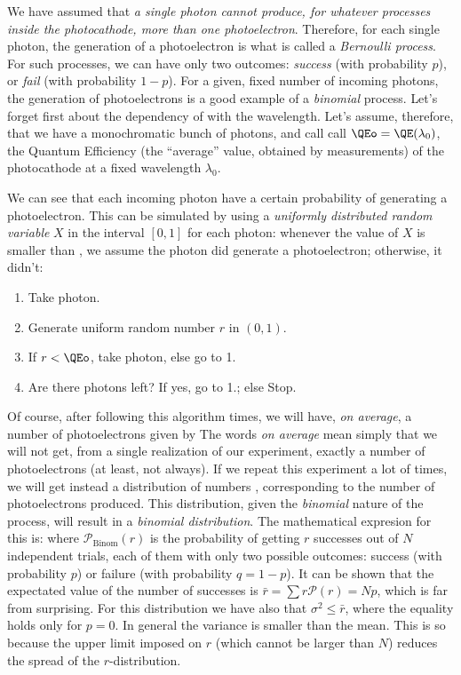 We have assumed that \emph{a single photon cannot produce, for
  whatever processes inside the photocathode, more than one
  photoelectron}. Therefore, for each single photon, the generation of
a photoelectron is what is called a \emph{Bernoulli process}. For such
processes, we can have only two outcomes: \emph{success} (with
probability $p$), or \emph{fail} (with probability $1-p$). For a
given, fixed number of incoming photons, the generation of
photoelectrons is a good example of a \emph{binomial} process. Let's
forget first about the dependency of \QE with the wavelength.  Let's
assume, therefore, that we have a monochromatic bunch of photons, and
call call $\QEo=\QE(\lambda_0)$, the Quantum Efficiency (the
``average'' value, obtained by measurements) of the photocathode at a
fixed wavelength $\lambda_0$.

\noutphotfig

We can see that each incoming photon have a certain probability \QEo
of generating a photoelectron. This can be simulated by using a
\emph{uniformly distributed random variable} $X$ in the interval
$[0,1]$ for each photon: whenever the value of $X$ is smaller than
\QEo, we assume the photon did generate a photoelectron; otherwise, it
didn't:
%
\begin{enumerate}
\item Take photon.
\item Generate uniform random number $r$ in $(0,1)$.
\item If $r < \QEo$, take photon, else go to 1.
\item Are there photons left? If yes, go to 1.; else Stop.
\end{enumerate}
%
Of course, after following this algorithm \Nphot times, we will have,
\emph{on average}, a number of photoelectrons given by
%
\nmeaneq
%
The words \emph{on average} mean simply that we will not get, from a
single realization of our experiment, exactly a number \Nmean of
photoelectrons (at least, not always). If we repeat this experiment a
lot of times, we will get instead a distribution of numbers \Ntrial,
corresponding to the number of photoelectrons produced. This
distribution, given the \emph{binomial} nature of the process, will
result in a \emph{binomial distribution}. The mathematical expresion
for this is:
%
\binomeq
%
where $\mathcal{P}_{\mathrm{Binom}}(r)$ is the probability of getting
$r$ successes out of $N$ independent trials, each of them with only
two possible outcomes: success (with probability $p$) or failure (with
probability $q=1-p$). It can be shown that the expectated value of the
number of successes is $\bar{r}=\sum r\mathcal{P}(r) = N p$, which is
far from surprising. For this distribution we have also that
$\sigma^{2} \leq \bar{r}$, where the equality holds only for $p=0$. In
general the variance is smaller than the mean. This is so because the
upper limit imposed on $r$ (which cannot be larger than $N$) reduces
the spread of the $r$-distribution.

